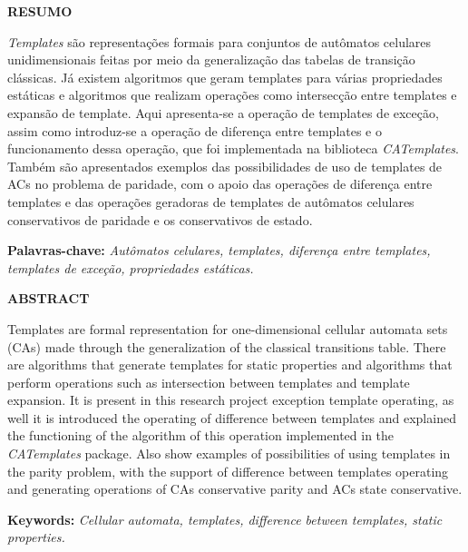 \newpage
\thispagestyle{plain}
\begin{center}
\large
\textbf{RESUMO}
\end{center}
\textit{Templates} são representações formais para conjuntos de autômatos celulares unidimensionais feitas por meio da generalização das tabelas de transição clássicas. Já existem algoritmos que geram templates para várias propriedades estáticas e algoritmos que realizam operações como intersecção entre templates e expansão de template. Aqui apresenta-se a operação de templates de exceção, assim como introduz-se a operação de diferença entre templates e o funcionamento dessa operação, que foi implementada na biblioteca \textit{CATemplates}. Também são apresentados exemplos das possibilidades de uso de templates de ACs no problema de paridade, com o apoio das operações de diferença entre templates e das operações geradoras de templates de autômatos celulares conservativos de paridade e os conservativos de estado.
\\[0.5cm]
\begin{flushleft}
{\bf Palavras-chave:} {\it Autômatos celulares, templates, diferença entre templates, templates de exceção, propriedades estáticas.}
\end{flushleft}

\newpage
\thispagestyle{plain}
\begin{center}
\large  
\textbf{ABSTRACT}
\end{center}
Templates are formal representation for one-dimensional cellular automata sets (CAs) made through the generalization of the classical transitions table. There are algorithms that generate templates for static properties and algorithms that perform operations such as intersection between templates and template expansion. It is present in this research project exception template operating, as well it is introduced the operating of difference between templates and explained the functioning of the algorithm of this operation implemented in the \textit{CATemplates} package. Also show examples of possibilities of using templates in the parity problem, with the support of difference between templates operating and generating operations of CAs conservative parity and ACs state conservative.
\\[0.5cm]
\begin{flushleft}
{\bf Keywords:} {\it Cellular automata, templates, difference between templates, static properties.}
\end{flushleft}